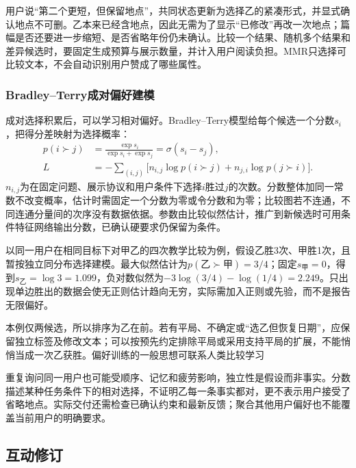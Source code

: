 用户说“第二个更短，但保留地点”，共同状态更新为选择乙的紧凑形式，并显式确认地点不可删。乙本来已经含地点，因此无需为了显示“已修改”再改一次地点；篇幅是否还要进一步缩短、是否省略年份仍未确认。比较一个结果、随机多个结果和差异候选时，要固定生成预算与展示数量，并计入用户阅读负担。MMR只选择可比较文本，不会自动识别用户赞成了哪些属性。

\subsubsection{Bradley--Terry成对偏好建模}
\label{sec:nlp-dialogue-bradley-terry}

成对选择积累后，可以学习相对偏好。Bradley--Terry模型给每个候选一个分数$s_i$，把得分差映射为选择概率：
\begin{equation}
\begin{aligned}
 p(i\succ j)&=\frac{\exp s_i}{\exp s_i+\exp s_j}
             =\sigma(s_i-s_j),\\
 L&=-\sum_{(i,j)}\bigl[n_{i,j}\log p(i\succ j)
               +n_{j,i}\log p(j\succ i)\bigr].
\end{aligned}
 \label{eq:nlp-dialogue-bt}
\end{equation}
$n_{i,j}$为在固定问题、展示协议和用户条件下选择$i$胜过$j$的次数。分数整体加同一常数不改变概率，估计时需固定一个分数为零或令分数和为零；比较图若不连通，不同连通分量间的次序没有数据依据。参数由比较似然估计，推广到新候选时可用条件特征网络输出分数，已确认硬要求仍保留为条件。

以同一用户在相同目标下对甲乙的四次教学比较为例，假设乙胜3次、甲胜1次，且暂按独立同分布选择建模。最大似然估计为$p(\text{乙}\succ\text{甲})=3/4$；固定$s_{\text{甲}}=0$，得到$s_{\text{乙}}=\log3=1.099$，负对数似然为$-3\log(3/4)-\log(1/4)=2.249$。只出现单边胜出的数据会使无正则估计趋向无穷，实际需加入正则或先验，而不是报告无限偏好。

本例仅两候选，所以排序为乙在前。若有平局、不确定或“选乙但恢复日期”，应保留独立标签及修改文本；可以按预先约定排除平局或采用支持平局的扩展，不能悄悄当成一次乙获胜。偏好训练的一般思想可联系人类比较学习

重复询问同一用户也可能受顺序、记忆和疲劳影响，独立性是假设而非事实。分数描述某种任务条件下的相对选择，不证明乙每一条事实都对，更不表示用户接受了省略地点。实际交付还需检查已确认约束和最新反馈；聚合其他用户偏好也不能覆盖当前用户的明确要求。

\subsection{互动修订}
\label{sec:nlp-dialogue-revision}


